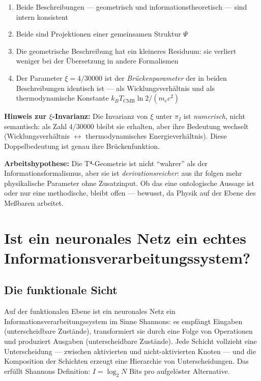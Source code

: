 \begin{enumerate}
  \item Beide Beschreibungen --- geometrisch und informationstheoretisch
        --- sind intern konsistent
  \item Beide sind Projektionen einer gemeinsamen Struktur $\Psi$
  \item Die geometrische Beschreibung hat ein kleineres Residuum:
        sie verliert weniger bei der Übersetzung in andere Formalismen
  \item Der Parameter $\xi = 4/30000$ ist der \emph{Brückenparameter}
        der in beiden Beschreibungen identisch ist --- als Wicklungsverhältnis
        und als thermodynamische Konstante $k_B T_\text{CMB} \ln 2 / (m_e c^2)$
\end{enumerate}

\textbf{Hinweis zur $\xi$-Invarianz:} Die Invarianz von $\xi$ unter $\pi_I$
ist \emph{numerisch}, nicht semantisch: als Zahl $4/30000$ bleibt sie
erhalten, aber ihre Bedeutung wechselt (Wicklungsverhältnis
$\leftrightarrow$ thermodynamisches Energieverhältnis). Diese Doppelbedeutung
ist genau ihre Brückenfunktion.

\textbf{Arbeitshypothese:} Die T⁴-Geometrie ist nicht ``wahrer'' als
der Informationsformalismus, aber sie ist \emph{derivationsreicher}:
aus ihr folgen mehr physikalische Parameter ohne Zusatzinput.
Ob das eine ontologische Aussage ist oder nur eine methodische,
bleibt offen --- bewusst, da Physik auf der Ebene des Meßbaren arbeitet.


\section{Ist ein neuronales Netz ein echtes Informations\-verarbeitungs\-system?}

\subsection{Die funktionale Sicht}

Auf der funktionalen Ebene ist ein neuronales Netz ein
Informationsverarbeitungssystem im Sinne Shannons: es empfängt Eingaben
(unterscheidbare Zustände), transformiert sie durch eine Folge von
Operationen und produziert Ausgaben (unterscheidbare Zustände). Jede
Schicht vollzieht eine Unterscheidung --- zwischen aktivierten und
nicht-aktivierten Knoten --- und die Komposition der Schichten erzeugt
eine Hierarchie von Unterscheidungen. Das erfüllt Shannons Definition:
$I = \log_2 N$ Bits pro aufgelöster Alternative.

